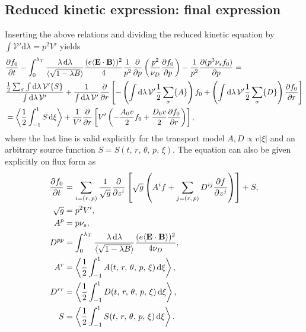 \documentclass[11pt,a4paper]{article}
\newcommand{\rd}{\ensuremath{\mathrm{d}}}
\renewcommand{\b}[1]{\ensuremath{ {\bf #1 } }}
\begin{document}
\subsection{Reduced kinetic expression: final expression}
Inserting the above relations and dividing the reduced kinetic equation by $\int \mathcal{V}'\rd\lambda = p^2 V'$ yields
\begin{align}
&\frac{\partial f_0}{\partial t} - \int_0^{\lambda_T}\frac{\lambda\,\rd \lambda}{\langle\sqrt{1-\lambda B}\rangle} \frac{(e\langle \b{E}\cdot\b{B}\rangle)^2}{4} \frac{1}{p^2}\frac{\partial}{\partial p} \left(\frac{p^2}{\nu_D}\frac{\partial f_0}{\partial p}\right) - \frac{1}{p^2}\frac{\partial(p^3 \nu_s f_0)}{\partial p} =  \nonumber \\
&\frac{\frac{1}{2}\sum_\sigma\int\rd\lambda \,\mathcal{V'}\{S\}}{\int \rd\lambda\,\mathcal{V}'}+\frac{1}{\int \rd \lambda \, \mathcal{V}' }\frac{\partial}{\partial r}\left[- \left(\int \rd \lambda \, \mathcal{V}' \frac{1}{2}\sum_\sigma\{A\}\right)f_0+  \left(\int \rd \lambda \, \mathcal{V}' \frac{1}{2}\sum_\sigma\{D\}\right)\frac{\partial f_0}{\partial r}\right] \nonumber \\
&=\left\langle \frac{1}{2}\int_{-1}^1  S\,\rd \xi \right\rangle +  \frac{1}{V'}\frac{\partial}{\partial r}\left[V' \left( -\frac{A_0 v}{2} f_0+  \frac{D_0 v}{2}\frac{\partial f_0}{\partial r}\right)\right],
\end{align}
where the last line is valid explicitly for the transport model $A,D \propto v|\xi|$ and an arbitrary source function $S=S(t,\,r,\,\theta,\,p,\,\xi)$. The equation can also be given explicitly on flux form as
\begin{align}
\frac{\partial f_0}{\partial t} &= \sum_{i=(r,\,p)}  \frac{1}{\sqrt{g}}\frac{\partial}{\partial z^i}\left[\sqrt{g}\left(A^if +\sum_{j=(r,\,p)} D^{ij}\frac{\partial f}{\partial z^j}\right)\right] + S, \nonumber \\
\sqrt{g} &= p^2V', \nonumber \\
A^p &= p\nu_s , \nonumber \\
D^{pp} &=  \int_0^{\lambda_T}\frac{\lambda\,\rd \lambda}{\langle\sqrt{1-\lambda B}\rangle} \frac{(e\langle \b{E}\cdot\b{B}\rangle)^2}{4\nu_D}, \nonumber \\
A^r &= \left\langle \frac{1}{2}\int_{-1}^1  A(t,\,r,\,\theta,\,p,\,\xi) \,\rd\xi \right\rangle, \nonumber \\
D^{rr} &= \left\langle \frac{1}{2}\int_{-1}^1  D(t,\,r,\,\theta,\,p,\,\xi) \,\rd\xi \right\rangle, \nonumber \\
S &= \left\langle \frac{1}{2}\int_{-1}^1  S(t,\,r,\,\theta,\,p,\,\xi) \,\rd\xi \right\rangle.
\end{align}
\end{document}
